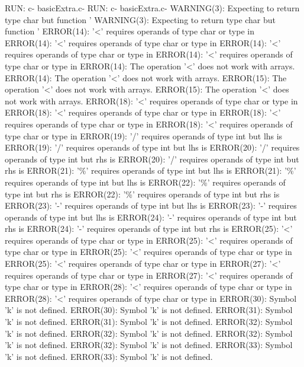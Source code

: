 \documentclass[12pt]{book}
\begin{document}
RUN: c- basicExtra.c-                                                RUN: c- basicExtra.c-
WARNING(3): Expecting to return type char but function '        WARNING(3): Expecting to return type char but function '
ERROR(14): '<' requires operands of type char or type in        ERROR(14): '<' requires operands of type char or type in
ERROR(14): '<' requires operands of type char or type in        ERROR(14): '<' requires operands of type char or type in
ERROR(14): The operation '<' does not work with arrays.                ERROR(14): The operation '<' does not work with arrays.
ERROR(15): The operation '<' does not work with arrays.                ERROR(15): The operation '<' does not work with arrays.
ERROR(18): '<' requires operands of type char or type in        ERROR(18): '<' requires operands of type char or type in
ERROR(18): '<' requires operands of type char or type in        ERROR(18): '<' requires operands of type char or type in
ERROR(19): '/' requires operands of type int but lhs is         ERROR(19): '/' requires operands of type int but lhs is 
ERROR(20): '/' requires operands of type int but rhs is         ERROR(20): '/' requires operands of type int but rhs is 
ERROR(21): '\%' requires operands of type int but lhs is         ERROR(21): '\%' requires operands of type int but lhs is 
ERROR(22): '\%' requires operands of type int but rhs is         ERROR(22): '\%' requires operands of type int but rhs is 
ERROR(23): '-' requires operands of type int but lhs is         ERROR(23): '-' requires operands of type int but lhs is 
ERROR(24): '-' requires operands of type int but rhs is         ERROR(24): '-' requires operands of type int but rhs is 
ERROR(25): '<' requires operands of type char or type in        ERROR(25): '<' requires operands of type char or type in
ERROR(25): '<' requires operands of type char or type in        ERROR(25): '<' requires operands of type char or type in
ERROR(27): '<' requires operands of type char or type in        ERROR(27): '<' requires operands of type char or type in
ERROR(28): '<' requires operands of type char or type in        ERROR(28): '<' requires operands of type char or type in
ERROR(30): Symbol 'k' is not defined.                                ERROR(30): Symbol 'k' is not defined.
ERROR(31): Symbol 'k' is not defined.                                ERROR(31): Symbol 'k' is not defined.
ERROR(32): Symbol 'k' is not defined.                                ERROR(32): Symbol 'k' is not defined.
ERROR(32): Symbol 'k' is not defined.                                ERROR(32): Symbol 'k' is not defined.
ERROR(33): Symbol 'k' is not defined.                                ERROR(33): Symbol 'k' is not defined.
\end{document}
